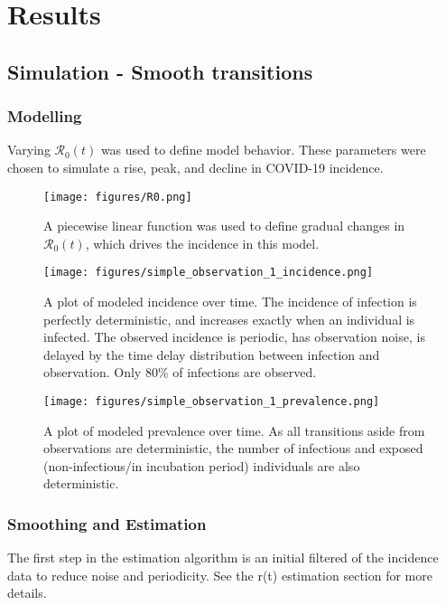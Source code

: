 \documentclass{article}
\newcommand{\nR}{\mathcal{R}}
\begin{document}
{\section{Results}

\subsection{Simulation - Smooth transitions}
\subsubsection{Modelling}

Varying $\nR_0(t)$ was used to define model behavior. These parameters were chosen to simulate a rise, peak, and decline in COVID-19 incidence.

\begin{figure}[h!]
\centering
\texttt{[image: figures/R0.png]}
\caption{A piecewise linear function was used to define gradual changes in $\nR_0(t)$, which drives the incidence in this model.}

\end{figure}

\clearpage
\begin{figure}[h!]
\centering
\texttt{[image: figures/simple\_observation\_1\_incidence.png]}
\caption{A plot of modeled incidence over time. The incidence of infection is perfectly deterministic, and increases exactly when an individual is infected. The observed incidence is periodic, has observation noise, is delayed by the time delay distribution between infection and observation. Only 80\% of infections are observed.}
\end{figure}

\begin{figure}[h!]
\centering
\texttt{[image: figures/simple\_observation\_1\_prevalence.png]}
\caption{A plot of modeled prevalence over time. As all transitions aside from observations are deterministic, the number of infectious and exposed (non-infectious/in incubation period) individuals are also deterministic.}
\end{figure}

\subsubsection{Smoothing and Estimation}

The first step in the estimation algorithm is an initial filtered of the incidence data to reduce noise and periodicity. See the r(t) estimation section for more details.

}
\end{document}
